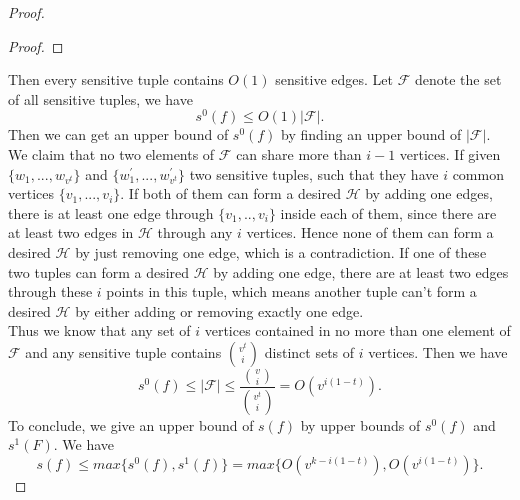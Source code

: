 \documentclass[psamsfonts]{amsart}
\theoremstyle{definition}
\theoremstyle{remark}
\numberwithin{equation}{section}
\begin{document}
\begin{proof}
\begin{proof}
		\end{proof}
		 Then every sensitive tuple contains $O(1)$ sensitive edges. Let $\mathcal{F}$ denote the set of all sensitive tuples, we have
		\begin{equation}
			s^0(f) \leq O(1)|\mathcal{F}|.
		\end{equation}
		Then we can get an upper bound of $s^0(f)$ by finding an upper bound of $|\mathcal{F}|$. We claim that no two elements of $\mathcal{F}$ can share more than $i-1$ vertices. If given $\{w_1,...,w_{v^t}\}$ and $\{w_1^\prime,...,w_{v^t}^\prime\}$ two sensitive tuples, such that they have $i$ common vertices $\{v_1,...,v_i\}$. If both of them can form a desired $\mathcal{H}$ by adding one edges, there is at least one edge through $\{v_1,..,v_i\}$ inside each of them, since there are at least two edges in $\mathcal{H}$ through any $i$ vertices. Hence none of them can form a desired $\mathcal{H}$ by just removing one edge, which is a contradiction. If one of these two tuples can form a desired $\mathcal{H}$ by adding one edge, there are at least two edges through these $i$ points in this tuple, which means another tuple can't form a desired $\mathcal{H}$ by either adding or removing exactly one edge.\\
		\indent Thus we know that any set of $i$ vertices contained in no more than one element of $\mathcal{F}$ and any sensitive tuple contains $v^t \choose{i}$ distinct sets of $i$ vertices. Then we have
		\begin{equation}
			s^0(f) \leq |\mathcal{F}| \leq \frac{{v \choose{i}}}{{v^t \choose{i}}} = O(v^{i(1-t)}).
		\end{equation}
		To conclude, we give an upper bound of $s(f)$ by upper bounds of $s^0(f)$ and $s^1(F)$. We have
		\begin{equation}
			s(f) \leq max\{s^0(f),s^1(f)\} = max\{ O(v^{k-i(1-t)}), O(v^{i(1-t)})\}.
		\end{equation}
	\end{proof}
	
\end{document}
